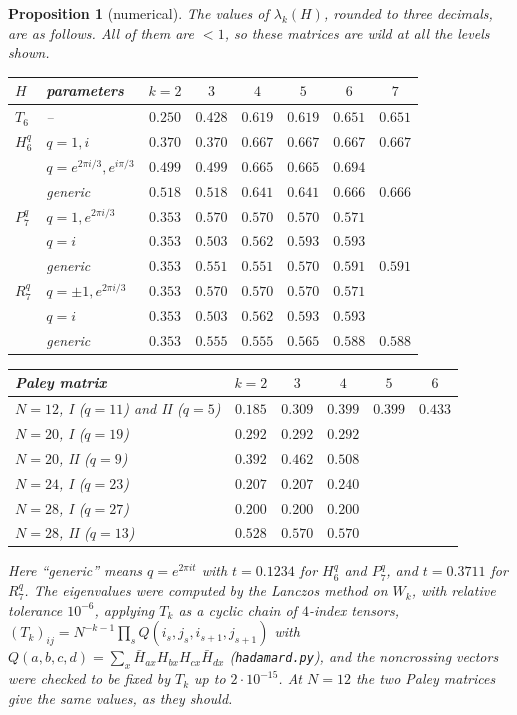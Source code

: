 \documentclass[11pt]{amsart}
\newtheorem{proposition}[theorem]{Proposition}
\theoremstyle{definition}
\theoremstyle{remark}
\theoremstyle{plain}
\numberwithin{equation}{section}
\numberwithin{table}{section}
\begin{document}
\begin{proposition}[numerical]\label{prop:wildnum}
The values of $\lambda_k(H)$, rounded to three decimals, are as follows. All of them are $<1$, so these matrices are wild at all the levels shown.
\begin{center}\small
\setlength{\tabcolsep}{5pt}
\begin{tabular}{@{}llcccccc@{}}\toprule
$H$ & parameters & $k=2$ & $3$ & $4$ & $5$ & $6$ & $7$\\\midrule
$T_6$ & -- & $0.250$ & $0.428$ & $0.619$ & $0.619$ & $0.651$ & $0.651$\\
$H_6^q$ & $q=1,i$ & $0.370$ & $0.370$ & $0.667$ & $0.667$ & $0.667$ & $0.667$\\
 & $q=e^{2\pi i/3},e^{i\pi/3}$ & $0.499$ & $0.499$ & $0.665$ & $0.665$ & $0.694$ & \\
 & generic & $0.518$ & $0.518$ & $0.641$ & $0.641$ & $0.666$ & $0.666$\\
$P_7^q$ & $q=1,e^{2\pi i/3}$ & $0.353$ & $0.570$ & $0.570$ & $0.570$ & $0.571$ & \\
 & $q=i$ & $0.353$ & $0.503$ & $0.562$ & $0.593$ & $0.593$ & \\
 & generic & $0.353$ & $0.551$ & $0.551$ & $0.570$ & $0.591$ & $0.591$\\
$R_7^q$ & $q=\pm1,e^{2\pi i/3}$ & $0.353$ & $0.570$ & $0.570$ & $0.570$ & $0.571$ & \\
 & $q=i$ & $0.353$ & $0.503$ & $0.562$ & $0.593$ & $0.593$ & \\
 & generic & $0.353$ & $0.555$ & $0.555$ & $0.565$ & $0.588$ & $0.588$\\\bottomrule
\end{tabular}

\medskip
\begin{tabular}{@{}lccccc@{}}\toprule
Paley matrix & $k=2$ & $3$ & $4$ & $5$ & $6$\\\midrule
$N=12$, I ($q=11$) and II ($q=5$) & $0.185$ & $0.309$ & $0.399$ & $0.399$ & $0.433$\\
$N=20$, I ($q=19$) & $0.292$ & $0.292$ & $0.292$ & & \\
$N=20$, II ($q=9$) & $0.392$ & $0.462$ & $0.508$ & & \\
$N=24$, I ($q=23$) & $0.207$ & $0.207$ & $0.240$ & & \\
$N=28$, I ($q=27$) & $0.200$ & $0.200$ & $0.200$ & & \\
$N=28$, II ($q=13$) & $0.528$ & $0.570$ & $0.570$ & & \\\bottomrule
\end{tabular}
\end{center}
Here ``generic'' means $q=e^{2\pi it}$ with $t=0.1234$ for $H_6^q$ and $P_7^q$, and $t=0.3711$ for $R_7^q$. The eigenvalues were computed by the Lanczos method on $W_k$, with relative tolerance $10^{-6}$, applying $T_k$ as a cyclic chain of $4$-index tensors, $(T_k)_{ij}=N^{-k-1}\prod_sQ(i_s,j_s,i_{s+1},j_{s+1})$ with $Q(a,b,c,d)=\sum_x\bar H_{ax}H_{bx}H_{cx}\bar H_{dx}$ (\texttt{hadamard.py}), and the noncrossing vectors were checked to be fixed by $T_k$ up to $2\cdot10^{-15}$. At $N=12$ the two Paley matrices give the same values, as they should.
\end{proposition}
\end{document}
